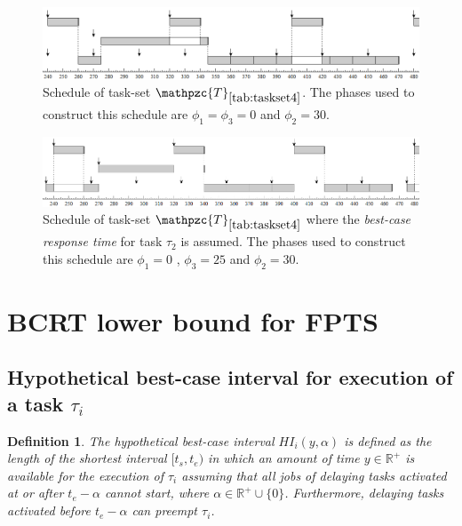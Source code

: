 \documentclass[fleqn]{article}
\newtheorem{definition}{Definition}
\begin{document}
\begin{figure}[H]
	\centering
	\includegraphics[width=0.9\linewidth]{figures/fact7_2}
	\caption{Schedule of task-set $\mathpzc{T}_{\ref{tab:taskset4}}$. The phases used to construct this schedule are $\phi_1 = \phi_3 = 0$ and $\phi_2 = 30$.}
	\label{fig:fact7_2}
\end{figure}

\begin{figure}[H]
	\centering
	\includegraphics[width=0.9\linewidth]{figures/fact7_3}
	\caption{Schedule of task-set $\mathpzc{T}_{\ref{tab:taskset4}}$ where the \textit{best-case response time} for task $\tau_2$ is assumed. The phases used to construct this schedule are $\phi_1 = 0$ , $\phi_3 = 25$ and $\phi_2 = 30$.}
	\label{fig:fact7_3}
\end{figure}

\section{BCRT lower bound for FPTS}
\subsection{Hypothetical best-case interval for execution of a task $\tau_i$}
\begin{definition}
The \textit{hypothetical best-case interval} $HI_i(y,\alpha)$ is defined as the length of the shortest interval $[t_s,t_e)$ in which an amount of time $y \in \mathbb{R}^+$ is available for the execution of $\tau_i$ assuming that all jobs of delaying tasks activated at or after $t_e-\alpha$ cannot start, where $\alpha \in \mathbb{R^+} \cup \{0\}$. Furthermore, delaying tasks activated before $t_e-\alpha$ can preempt $\tau_i$.
\end{definition}
\end{document}
